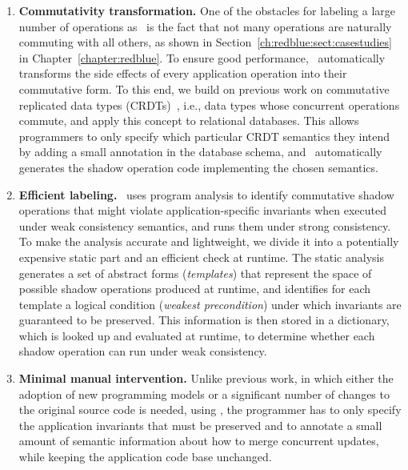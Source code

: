 \begin{enumerate}
\item {\bf Commutativity transformation.} One of the obstacles for labeling a large number
of operations as \blue\ is the fact that not many operations are naturally
commuting with all others, as shown in Section~\ref{ch:redblue:sect:casestudies} in Chapter~\ref{chapter:redblue}. 
To ensure good performance, \tool\ automatically transforms the side effects of every application operation into their commutative
form. To this end, we build on previous work on commutative replicated data types
(CRDTs)~\cite{Shapiro2011Conflict,Preguica2009CRDT}, i.e., data types whose
concurrent operations commute, and apply this concept to relational
databases. This allows programmers to only specify which particular CRDT semantics they intend by
adding a small annotation in the database schema, and \tool\ automatically
generates the shadow operation code implementing the chosen semantics.

\item {\bf Efficient labeling.} \tool\ uses program analysis to identify commutative shadow operations that might
violate application-specific invariants when
executed under weak consistency semantics, and runs them under strong
consistency. To make the analysis accurate and lightweight,
we divide it into a potentially expensive static part and an
efficient check at runtime. The static analysis generates a set of
abstract forms ({\em templates}) that represent the space of possible shadow operations produced at runtime,
and identifies for each template a logical condition ({\em weakest precondition}) under which
invariants are guaranteed to be preserved. This information is
then stored in a dictionary, which is looked up and evaluated at
runtime,
to determine whether each shadow operation can run under weak consistency.

\item {\bf Minimal manual intervention.} Unlike previous work, in which
either the adoption of new programming models or a significant number of changes to
the original source code is needed, using \tool, the programmer has to 
only specify the application invariants that must be preserved
and to annotate a small amount of semantic information
about how to merge concurrent updates, while keeping the application code base unchanged.
\end{enumerate}

